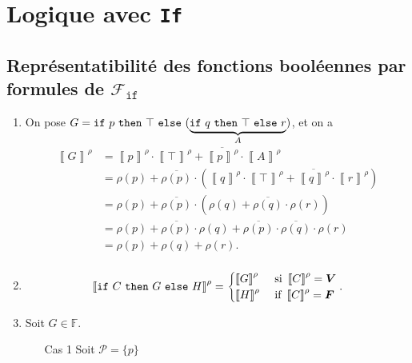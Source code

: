 \section{Logique avec \texttt{If}}

\subsection{Représentatibilité des fonctions booléennes par formules de $\mathcal{F}_\texttt{if}$\/}

\begin{enumerate}
	\item On pose $G = {\tt if}\/\ p\ {\tt then}\/\ \top\ {\tt else}\/\ (\underbrace{{\tt if}\/\ q\ {\tt then}\/\ \top\ {\tt else}\/\ r}_{A})$, et on a
		\begin{align*}
			\left\llbracket G \right\rrbracket^\rho
			&= \left\llbracket p \right\rrbracket^\rho \cdot \left\llbracket \top \right\rrbracket^\rho + \overline{\left\llbracket p \right\rrbracket^\rho}  \cdot \left\llbracket A \right\rrbracket^\rho \\
			&= \rho(p) + \overline{\rho(p)} \cdot  \left( \left\llbracket q \right\rrbracket^\rho \cdot \left\llbracket \top \right\rrbracket^\rho + \overline{\left\llbracket q \right\rrbracket^\rho} \cdot \left\llbracket r \right\rrbracket^\rho \right) \\
			&= \rho(p) + \overline{\rho(p)} \cdot  \left( \rho(q) + \overline{\rho(q)} \cdot \rho(r) \right) \\
			&= \rho(p) + \overline{\rho(p)}\cdot \rho(q) + \overline{\rho(p)} \cdot  \overline{\rho(q)} \cdot \rho(r) \\
			&= \rho(p) + \rho(q) + \rho(r). \\
		\end{align*}
	\item \[
			\left\llbracket {\tt if}\/\ C\ {\tt then}\/\ G\ {\tt else}\/\ H \right\rrbracket^\rho = \begin{cases}
				\left\llbracket G \right\rrbracket^\rho &\text{ si }\left\llbracket C \right\rrbracket^\rho = {\bm{V}}\\
				\left\llbracket H \right\rrbracket^\rho &\text{ if } \left\llbracket C \right\rrbracket^\rho = {\bm{F}}
			\end{cases}
		.\]
	\item Soit $G \in \mathds{F}$.
		\begin{itemize}
			\item[Cas 1] Soit $\mathcal{P} = \{p\}$\/
				\begin{itemize}

\end{itemize}
\end{itemize}
\end{enumerate}
